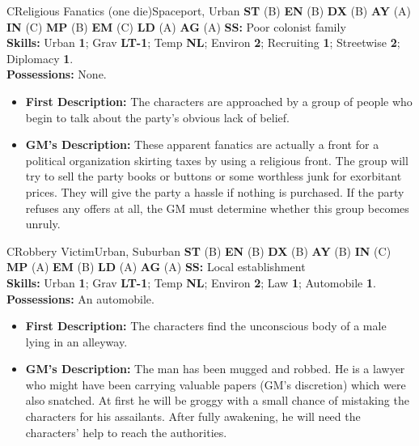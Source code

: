 \hrulefill

\begin{npc}{C}{Religious Fanatics (one die)}{Spaceport, Urban}
  \textbf{ST} (B) \textbf{EN} (B) \textbf{DX} (B) \textbf{AY} (A)
  \textbf{IN} (C) \textbf{MP} (B) \textbf{EM} (C) \textbf{LD} (A)
  \textbf{AG} (A) \textbf{SS:} Poor colonist family \\ 
  \textbf{Skills:} Urban \textbf{1}; Grav \textbf{LT-1}; Temp
  \textbf{NL}; Environ \textbf{2}; Recruiting \textbf{1}; Streetwise
  \textbf{2}; Diplomacy \textbf{1}. \\ 
  \textbf{Possessions:} None. 
  \begin{itemize}
  \item \textbf{First Description:} The characters are approached by a
    group of people who begin to talk about the party's obvious lack of
    belief.
  \item \textbf{GM's Description:} These apparent fanatics are actually
    a front for a political organization skirting taxes by using a
    religious front.  The group will try to sell the party books or
    buttons or some worthless junk for exorbitant prices. They will give
    the party a hassle if nothing is purchased. If the party refuses any
    offers at all, the GM must determine whether this group becomes
    unruly.
  \end{itemize}
\end{npc}

\hrulefill

\begin{npc}{C}{Robbery Victim}{Urban, Suburban}
  \textbf{ST} (B) \textbf{EN} (B) \textbf{DX} (B) \textbf{AY} (B)
  \textbf{IN} (C) \textbf{MP} (A) \textbf{EM} (B) \textbf{LD} (A)
  \textbf{AG} (A) \textbf{SS:} Local establishment \\ 
  \textbf{Skills:} Urban \textbf{1}; Grav \textbf{LT-1}; Temp
  \textbf{NL}; Environ \textbf{2}; Law \textbf{1}; Automobile
  \textbf{1}. \\ 
  \textbf{Possessions:} An automobile. 
  \begin{itemize}
  \item \textbf{First Description:} The characters find the
    unconscious body of a male lying in an alleyway.
  \item \textbf{GM's Description:} The man has been mugged and robbed.
    He is a lawyer who might have been carrying valuable papers (GM's
    discretion) which were also snatched. At first he will be groggy
    with a small chance of mistaking the characters for his
    assailants. After fully awakening, he will need the characters'
    help to reach the authorities.
  \end{itemize}
\end{npc}

